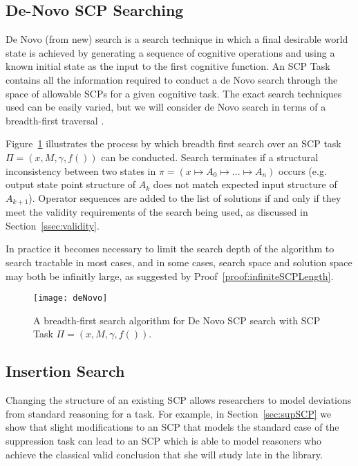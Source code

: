 \subsection{De-Novo SCP Searching} \label{ssec:denovo}
De Novo (from new) search is a search technique in which a final desirable world state is achieved by generating a sequence of cognitive operations and using a known initial state as the input to the first cognitive function. An SCP Task contains all the information required to conduct a de Novo search through the space of allowable SCPs for a given cognitive task. The exact search techniques used can be easily varied, but we will consider de Novo search in terms of a breadth-first traversal \cite{zhou2006breadth}. 

Figure~\ref{fig:deNovo} illustrates the process by which breadth first search over an SCP task $\Pi=(x,M,\gamma,f())$ can be conducted. Search terminates if a structural inconsistency between two states in $\pi=(x\longmapsto A_0 \longmapsto ... \longmapsto A_n)$ occurs (e.g. output state point structure of $A_k$ does not match expected input structure of $A_{k+1}$). Operator sequences are added to the list of solutions if and only if they meet the validity requirements of the search being used, as discussed in Section~\ref{ssec:validity}. 

In practice it becomes necessary to limit the search depth of the algorithm to search tractable in most cases, and in some cases, search space and solution space may both be infinitly large, as suggested by Proof~\ref{proof:infiniteSCPLength}.

\begin{figure}
\begin{center}
\texttt{[image: deNovo]}
\end{center}
\caption{A breadth-first search algorithm for De Novo SCP search with SCP Task $\Pi=(x,M,\gamma,f())$.}
\label{fig:deNovo}
\end{figure}

\subsection{Insertion Search}\label{ssec:insertion}

Changing the structure of an existing SCP allows researchers to model deviations from standard reasoning for a task. For example, in Section~\ref{sec:supSCP} we show that slight modifications to an SCP that models the standard case of the suppression task can lead to an SCP which is able to model reasoners who achieve the classical valid conclusion that she will study late in the library.

